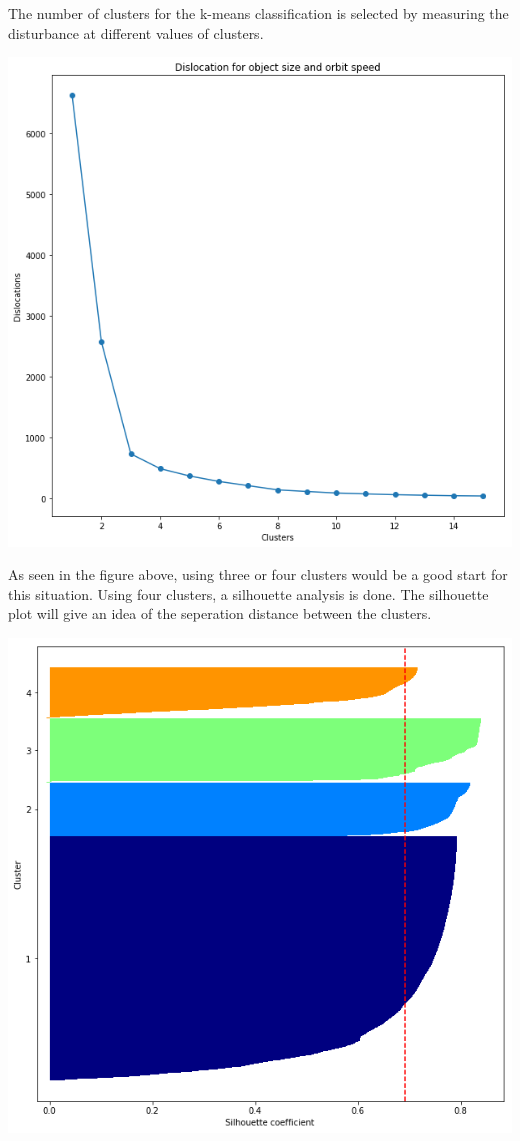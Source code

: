 \documentclass[12pt,a4paper]{article}
\begin{document}
The number of clusters for the k-means classification is selected by measuring the disturbance at different values of clusters.
\begin{center}
	\includegraphics[scale=0.3]{figures/dislocation_obj_size.png}
	\label{fig:Dislocation}
\end{center}
As seen in the figure above, using three or four clusters would be a good start for this situation. Using four clusters, a silhouette analysis is done. The silhouette plot will give an idea of the seperation distance between the clusters.
\begin{center}
	\includegraphics[scale=0.3]{figures/Silhouette.png}
	\label{fig:Silhouette}
\end{center}
\end{document}
